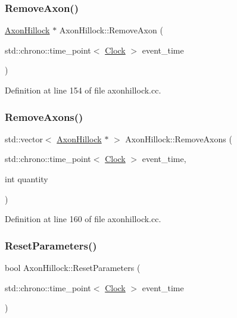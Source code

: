 \subsubsection{\texorpdfstring{Remove\+Axon()}{RemoveAxon()}}
{\footnotesize\ttfamily \mbox{\hyperlink{class_axon_hillock}{Axon\+Hillock}} $\ast$ Axon\+Hillock\+::\+Remove\+Axon (\begin{DoxyParamCaption}\item[{std\+::chrono\+::time\+\_\+point$<$ \mbox{\hyperlink{universe_8h_a0ef8d951d1ca5ab3cfaf7ab4c7a6fd80}{Clock}} $>$}]{event\+\_\+time }\end{DoxyParamCaption})}



Definition at line 154 of file axonhillock.\+cc.

\mbox{\label{class_axon_hillock_a7f10edff727271408887d29a70e7e671}} 
\subsubsection{\texorpdfstring{Remove\+Axons()}{RemoveAxons()}}
{\footnotesize\ttfamily std\+::vector$<$ \mbox{\hyperlink{class_axon_hillock}{Axon\+Hillock}} $\ast$ $>$ Axon\+Hillock\+::\+Remove\+Axons (\begin{DoxyParamCaption}\item[{std\+::chrono\+::time\+\_\+point$<$ \mbox{\hyperlink{universe_8h_a0ef8d951d1ca5ab3cfaf7ab4c7a6fd80}{Clock}} $>$}]{event\+\_\+time,  }\item[{int}]{quantity }\end{DoxyParamCaption})}



Definition at line 160 of file axonhillock.\+cc.

\mbox{\label{class_axon_hillock_acec1571ef0b74f7f5ce6699c9b459b4f}} 
\subsubsection{\texorpdfstring{Reset\+Parameters()}{ResetParameters()}}
{\footnotesize\ttfamily bool Axon\+Hillock\+::\+Reset\+Parameters (\begin{DoxyParamCaption}\item[{std\+::chrono\+::time\+\_\+point$<$ \mbox{\hyperlink{universe_8h_a0ef8d951d1ca5ab3cfaf7ab4c7a6fd80}{Clock}} $>$}]{event\+\_\+time }\end{DoxyParamCaption})}



